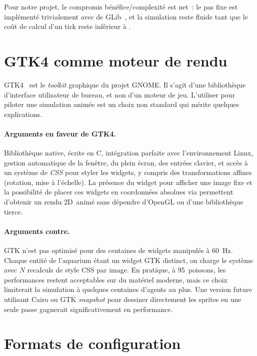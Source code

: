 Pour notre projet, le compromis bénéfice/complexité est net~: le
pas fixe est implémenté trivialement avec
 de GLib~\cite{glib}, et la
simulation reste fluide tant que le coût de calcul d'un tick reste
inférieur à .

\section{GTK4 comme moteur de rendu}

GTK4~\cite{gtk4docs} est le \emph{toolkit} graphique du projet
GNOME. Il s'agit d'une bibliothèque d'interface utilisateur de
bureau, et non d'un moteur de jeu. L'utiliser pour piloter une
simulation animée est un choix non standard qui mérite quelques
explications.

\paragraph{Arguments en faveur de GTK4.} Bibliothèque native, écrite
en C, intégration parfaite avec l'environnement Linux, gestion
automatique de la fenêtre, du plein écran, des entrées clavier,
et accès à un système de \emph{CSS} pour styler les widgets, y
compris des transformations affines (rotation, mise à l'échelle).
La présence du widget  pour afficher une image
fixe et la possibilité de placer ces widgets en coordonnées
absolues via  permettent d'obtenir un rendu
2D~animé sans dépendre d'OpenGL ou d'une bibliothèque tierce.

\paragraph{Arguments contre.} GTK n'est pas optimisé pour des
centaines de widgets manipulés à 60~Hz. Chaque entité de
l'aquarium étant un widget GTK distinct, on charge le système avec
$N$ recalculs de style CSS par image. En pratique, à 95~poissons,
les performances restent acceptables sur du matériel moderne, mais
ce choix limiterait la simulation à quelques centaines d'agents
au plus. Une version future utilisant Cairo ou GTK \emph{snapshot}
pour dessiner directement les sprites en une seule passe gagnerait
significativement en performance.

\section{Formats de configuration}
\label{sec:config-formats}


